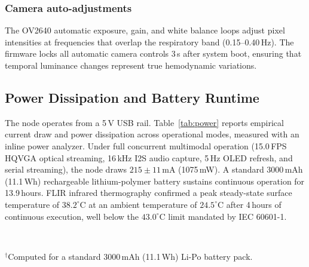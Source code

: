 \documentclass[journal]{IEEEtran}
\begin{document}
\subsubsection{Camera auto-adjustments}
The OV2640 automatic exposure, gain, and white balance loops adjust pixel intensities at frequencies that overlap the respiratory band (0.15--0.40\,Hz). The firmware locks all automatic camera controls 3\,s after system boot, ensuring that temporal luminance changes represent true hemodynamic variations.

\subsection{Power Dissipation and Battery Runtime}
The node operates from a 5\,V USB rail. Table~\ref{tab:power} reports empirical current draw and power dissipation across operational modes, measured with an inline power analyzer. Under full concurrent multimodal operation (15.0\,FPS HQVGA optical streaming, 16\,kHz I2S audio capture, 5\,Hz OLED refresh, and serial streaming), the node draws $215 \pm 11$\,mA (1075\,mW). A standard 3000\,mAh (11.1\,Wh) rechargeable lithium-polymer battery sustains continuous operation for 13.9\,hours. FLIR infrared thermography confirmed a peak steady-state surface temperature of $38.2^\circ$C at an ambient temperature of $24.5^\circ$C after 4\,hours of continuous execution, well below the $43.0^\circ$C limit mandated by IEC 60601-1.

\begin{table}[!t]
\centering
\caption{Measured Supply Current, Power Dissipation, and Battery Runtime of the Edge Node at 5\,V}
\label{tab:power}
\footnotesize
\renewcommand{\arraystretch}{1.1}
\\[2pt]
\parbox{\columnwidth}{\scriptsize $^{\dagger}$Computed for a standard 3000\,mAh (11.1\,Wh) Li-Po battery pack.}
\end{table}
\end{document}
